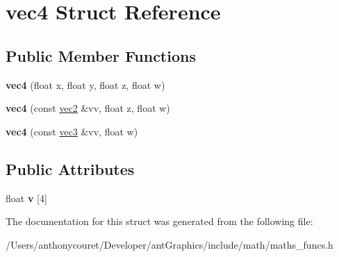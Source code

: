 \hypertarget{structvec4}{\section{vec4 Struct Reference}
\label{structvec4}
}
\subsection*{Public Member Functions}
\begin{DoxyCompactItemize}
\item 
\hypertarget{structvec4_a4174b718621ba5b473ea2c289f11fe46}{{\bfseries vec4} (float x, float y, float z, float w)}\label{structvec4_a4174b718621ba5b473ea2c289f11fe46}

\item 
\hypertarget{structvec4_ab203f1386ef0b79671e9a1324ceee484}{{\bfseries vec4} (const \hyperlink{structvec2}{vec2} \&vv, float z, float w)}\label{structvec4_ab203f1386ef0b79671e9a1324ceee484}

\item 
\hypertarget{structvec4_a8ba17db652f62b23a98cd481390f35da}{{\bfseries vec4} (const \hyperlink{structvec3}{vec3} \&vv, float w)}\label{structvec4_a8ba17db652f62b23a98cd481390f35da}

\end{DoxyCompactItemize}
\subsection*{Public Attributes}
\begin{DoxyCompactItemize}
\item 
\hypertarget{structvec4_a08f56ae363c0cabebd3fe446ef28e652}{float {\bfseries v} \mbox{[}4\mbox{]}}\label{structvec4_a08f56ae363c0cabebd3fe446ef28e652}

\end{DoxyCompactItemize}


The documentation for this struct was generated from the following file\+:\begin{DoxyCompactItemize}
\item 
/\+Users/anthonycouret/\+Developer/ant\+Graphics/include/math/maths\+\_\+funcs.\+h\end{DoxyCompactItemize}
